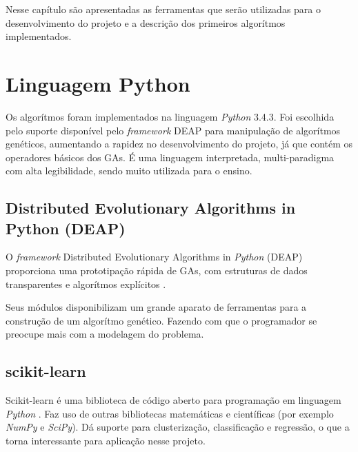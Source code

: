 Nesse capítulo são apresentadas as ferramentas que serão utilizadas para o
desenvolvimento do projeto e a descrição dos primeiros algorítmos implementados.

\section{Linguagem Python}
Os algorítmos foram implementados na linguagem {\it Python} 3.4.3. Foi escolhida
pelo suporte disponível pelo {\it framework} DEAP para manipulação de algorítmos
genéticos, aumentando a rapidez no desenvolvimento do projeto, já que contém os 
operadores básicos dos GAs. É uma linguagem interpretada, multi-paradigma com 
alta legibilidade, sendo muito utilizada para o ensino.  

\subsection{Distributed Evolutionary Algorithms in Python (DEAP)}
O {\it framework} Distributed Evolutionary Algorithms in {\it Python} (DEAP) 
proporciona uma prototipação rápida de GAs, com estruturas de dados transparentes
e algorítmos explícitos \cite{deap}.

Seus módulos disponibilizam um grande aparato de ferramentas para a construção de
um algorítmo genético. Fazendo com que o programador se preocupe mais com a 
modelagem do problema.
\subsection{scikit-learn}
Scikit-learn é uma biblioteca de código aberto para programação em linguagem 
{\it Python} \cite{scikit_learn}. Faz uso de outras bibliotecas matemáticas e 
científicas (por exemplo {\it NumPy} e {\it SciPy}). Dá suporte para clusterização,
classificação e regressão, o que a torna interessante para aplicação nesse projeto.


